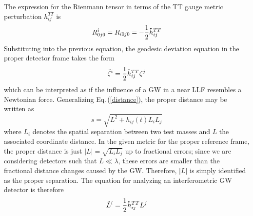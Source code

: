 \documentclass[binding=0.6cm, LaM]{sapthesis}
\begin{document}
        The expression for the Rienmann tensor in terms of the TT gauge metric perturbation $h_{ij}^{TT}$ is
        \begin{equation}
          R^i_{0j0} = R_{i0j0} = - {1 \over 2}{\ddot h}_{ij}^{TT}
        \end{equation}
        Substituting into the previous equation, the geodesic deviation equation in the proper detector frame takes the form
        \begin{equation}
          {\ddot \zeta}^i = {1 \over 2}{\ddot h}_{ij}^{TT}\zeta^j
        \end{equation}
        which can be interpreted as if the influence of a GW in a near LLF resembles a Newtonian force.
        Generalizing Eq.\,(\ref{distance}), the proper distance may be written as
        \begin{equation}
          s = \sqrt{L^2 + h_{ij}(t)L_{i}L_{j}}
        \end{equation}
        where $L_i$ denotes the spatial separation between two test masses and $L$ the associated coordinate distance.
        In the given metric for the proper reference frame, the proper distance is just $|L| = \sqrt{L_iL_j}$ up to fractional errors;
        since we are considering detectors such that
        $L \ll \lambda$, these errors are smaller than the fractional distance changes caused by the GW.
        Therefore, $|L|$ is simply identified as the proper separation. The equation for analyzing an interferometric GW detector is therefore
        \begin{equation}
          {\ddot L}^i = {1 \over 2}{\ddot h}_{ij}^{TT}L^j
        \end{equation}
\end{document}
